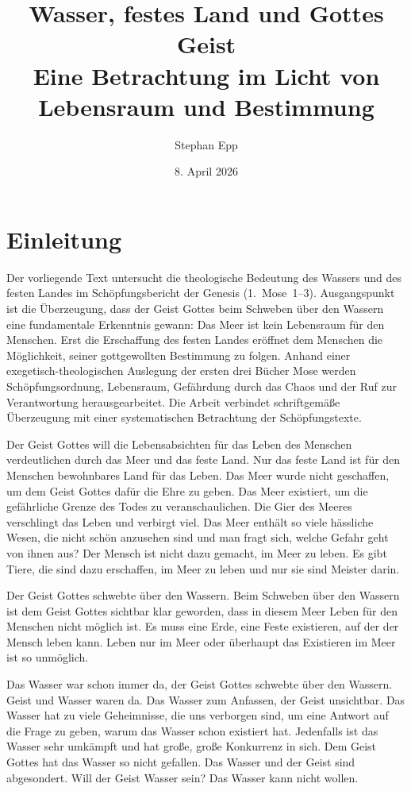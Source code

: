 ﻿\documentclass[a4paper,12pt]{article}
\title{\textbf{Wasser, festes Land und Gottes Geist}\\[-0.1em]
	Eine Betrachtung im Licht von \\ Lebensraum und Bestimmung}
\author{Stephan Epp}
\date{8. April 2026}
\theoremstyle{definition}
\begin{document}
\maketitle
\tableofcontents
\newpage

\section{Einleitung}
        Der vorliegende Text untersucht die theologische Bedeutung des Wassers
und des festen Landes im Schöpfungsbericht der Genesis (1.~Mose~1--3).
Ausgangspunkt ist die Überzeugung, dass der Geist Gottes beim Schweben
über den Wassern eine fundamentale Erkenntnis gewann: Das Meer ist kein
Lebensraum für den Menschen. Erst die Erschaffung des festen Landes
eröffnet dem Menschen die Möglichkeit, seiner gottgewollten Bestimmung
zu folgen. Anhand einer exegetisch-theologischen Auslegung der ersten
drei Bücher Mose werden Schöpfungsordnung, Lebensraum, Gefährdung durch
das Chaos und der Ruf zur Verantwortung herausgearbeitet. Die Arbeit
verbindet schriftgemäße Überzeugung mit einer systematischen Betrachtung
der Schöpfungstexte.

Der Geist Gottes will die Lebensabsichten für das Leben des Menschen verdeutlichen
durch das Meer und das feste Land. Nur das feste Land ist für den Menschen
bewohnbares Land für das Leben. Das Meer wurde nicht geschaffen, um dem Geist Gottes
dafür die Ehre zu geben. Das Meer existiert, um die gefährliche Grenze des Todes
zu veranschaulichen. Die Gier des Meeres verschlingt das Leben und verbirgt viel.
Das Meer enthält so viele hässliche Wesen, die nicht schön anzusehen sind und man
fragt sich, welche Gefahr geht von ihnen aus? Der Mensch ist nicht dazu gemacht,
im Meer zu leben. Es gibt Tiere, die sind dazu erschaffen, im Meer zu leben und
nur sie sind Meister darin.

Der Geist Gottes schwebte über den Wassern. Beim Schweben über den Wassern ist
dem Geist Gottes sichtbar klar geworden, dass in diesem Meer Leben für den Menschen
nicht möglich ist. Es muss eine Erde, eine Feste existieren, auf der der Mensch
leben kann. Leben nur im Meer oder überhaupt das Existieren im Meer ist so unmöglich.

Das Wasser war schon immer da, der Geist Gottes schwebte über den Wassern. Geist
und Wasser waren da. Das Wasser zum Anfassen, der Geist unsichtbar. Das Wasser
hat zu viele Geheimnisse, die uns verborgen sind, um eine Antwort auf die Frage
zu geben, warum das Wasser schon existiert hat. Jedenfalls ist das Wasser sehr
umkämpft und hat große, große Konkurrenz in sich. Dem Geist Gottes hat das Wasser
so nicht gefallen. Das Wasser und der Geist sind abgesondert. Will der Geist Wasser
sein? Das Wasser kann nicht wollen.
\end{document}
